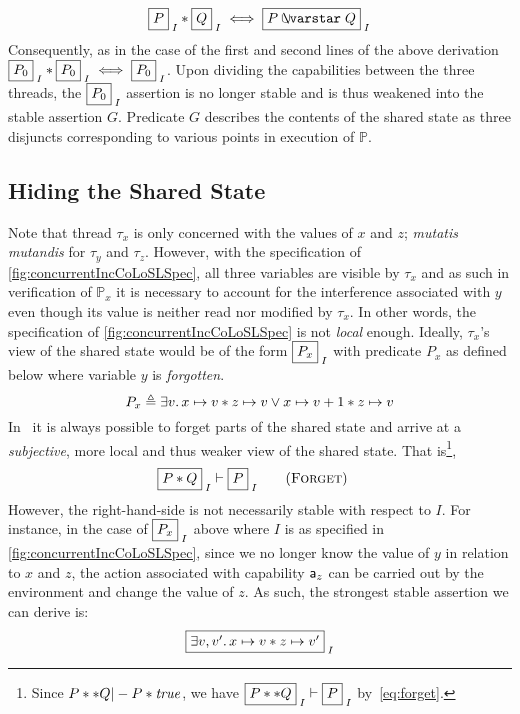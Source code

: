 %
\[
	\shared{P}{I} * \shared{Q}{I} \iff \shared{P \sepish Q}{I}
\]
%
Consequently, as in the case of the first and second lines of the above derivation $\shared{P_0}{I} * \shared{P_0}{I} \iff \shared{P_0}{I}$. Upon dividing the capabilities between the three threads, the $\shared{P_0}{I}$ assertion is no longer stable and is thus weakened into the stable assertion $G$. Predicate $G$ describes the contents of the shared state as three disjuncts corresponding to various points in execution of $\mathbb{P}$. 
%
%
%
\subsection{Hiding the Shared State}\label{subsec:hide}
Note that thread $\tau_x$ is only concerned with the values of $x$ and
$z$; \emph{mutatis mutandis} for $\tau_y$ and $\tau_z$. However, with
the specification of \fig\ref{fig:concurrentIncCoLoSLSpec}, all three
variables are visible by $\tau_x$ and as such in verification of
$\mathbb{P}_x$ it is necessary to account for the interference
associated with $y$ even though its value is neither read nor modified
by $\tau_x$. In other words, the specification of
\fig\ref{fig:concurrentIncCoLoSLSpec} is not \emph{local}
enough. Ideally, $\tau_x$'s view of the shared state would be of the form $\shared{P_x}{I}$ with predicate $P_x$ as defined below where variable $y$ is \emph{forgotten}.
%
\[
	P_x \mathrel{\triangleq} \exists v.\, x \mapsto v * z \mapsto v \lor x \mapsto v+1 * z \mapsto v
\]
%
In \colosl\ it is always possible to forget parts of the shared state
and arrive at a \emph{subjective}, more local and thus weaker view of
the shared state. That is\footnote{Since $P ** Q |- P * \mathit{true}$, we
  have $\shared{P ** Q}{I} \vdash \shared{P}{I}$ by~\eqref{eq:forget}.},
%
\begin{align*}
  \label{eq:forget}
  \shared{P * Q}{I} &\vdash \shared{P}{I}  \tag{\textsc{Forget}}
\end{align*}
%
However, the right-hand-side is not necessarily stable with respect to $I$. For instance, in the case of $\shared{P_x}{I}$ above where $I$ is as specified in \fig\ref{fig:concurrentIncCoLoSLSpec}, since we no longer know the value of $y$ in relation to $x$ and $z$, the action associated with capability $\mathsf{a}_z$ can be carried out by the environment and change the value of $z$. As such, the strongest stable assertion we can derive is: 
%
\[
	\shared{\exsts{v, v'}  \cell{x}{v} * \cell{z}{v'}}{I}
\]


